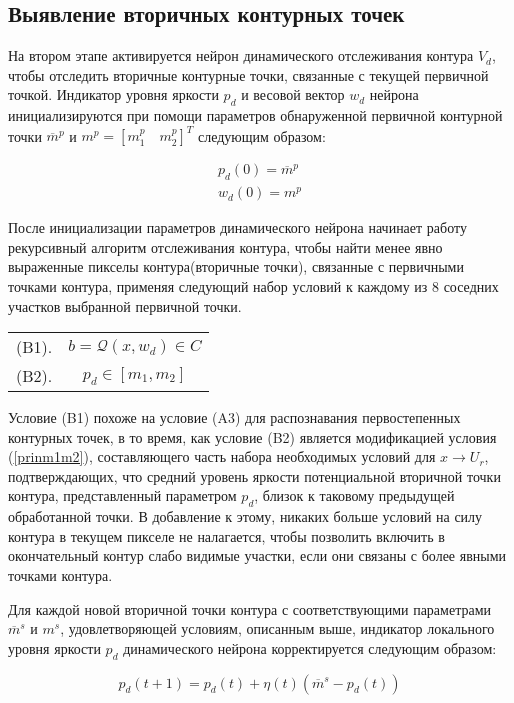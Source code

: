 \documentclass[a4paper,12pt]{report}
\begin{document}
\subsection{Выявление вторичных контурных точек}
 
На втором этапе активируется нейрон динамического отслеживания контура $V_d$, чтобы отследить вторичные  контурные точки, связанные с текущей первичной точкой. Индикатор уровня яркости $p_d$ и весовой вектор $w_d$ нейрона инициализируются при помощи параметров обнаруженной первичной контурной точки $\overline{m}^p$  и $m^p =[m^p_1\quad m^p_2]^T$ следующим образом:

\begin{eqnarray}
p_d(0)=\overline{m}^p \\
w_d(0)=m^p
\end{eqnarray}

После инициализации параметров динамического нейрона начинает работу рекурсивный алгоритм отслеживания контура, чтобы найти менее явно выраженные пикселы контура(вторичные точки), связанные с первичными точками контура, применяя следующий набор условий к каждому из 8 соседних участков выбранной первичной точки.

\begin{tabular}{lc}
(B1). & $b=\mathcal{Q}(x,w_d)\in C$ \\
(B2). & $p_d\in [m_1, m_2]$
\end{tabular}

Условие (B1) похоже на условие (A3) для распознавания первостепенных контурных точек, в то время, как условие (B2) является модификацией условия (\ref{prinm1m2}), составляющего часть набора необходимых условий для $x\rightarrow U_r$, подтверждающих, что средний уровень яркости потенциальной вторичной точки контура, представленный параметром $p_d$, близок к таковому предыдущей обработанной точки. В добавление к этому, никаких больше условий на силу контура в текущем пикселе не налагается, чтобы позволить включить в окончательный контур слабо видимые участки, если они связаны с более явными точками контура.

Для каждой новой вторичной точки контура с соответствующими  параметрами $\overline{m}^s$ и $m^s$, удовлетворяющей условиям, описанным выше, индикатор локального уровня яркости $p_d$ динамического нейрона корректируется следующим образом:

\begin{equation}
p_d(t+1)=p_d(t)+\eta (t)(\overline{m}^s-p_d(t))
\end{equation}
\end{document}
